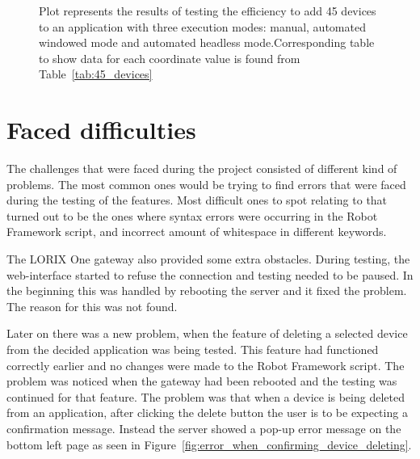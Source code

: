 \begin{figure}[H]
    \caption{Plot represents the results of testing the efficiency to add 45 devices to an application with three execution modes: manual, automated windowed mode and automated headless mode.Corresponding table to show data for each coordinate value is found from Table~\ref{tab:45_devices}}\label{fig:45_devices}
\end{figure}

\clearpage

\section{Faced difficulties}
The challenges that were faced during the project consisted of different kind of problems.
The most common ones would be trying to find errors that were faced during the testing of the features.
Most difficult ones to spot relating to that turned out to be the ones where syntax errors were occurring in the Robot Framework script, and incorrect amount of whitespace in different keywords.

The LORIX One gateway also provided some extra obstacles.
During testing, the web-interface started to refuse the connection and testing needed to be paused.
In the beginning this was handled by rebooting the server and it fixed the problem.
The reason for this was not found.

Later on there was a new problem, when the feature of deleting a selected device from the decided application was being tested.
This feature had functioned correctly earlier and no changes were made to the Robot Framework script. 
The problem was noticed when the gateway had been rebooted and the testing was continued for that feature.
The problem was that when a device is being deleted from an application, after clicking the delete button the user is to be expecting a confirmation message.
Instead the server showed a pop-up error message on the bottom left page as seen in Figure~\ref{fig:error_when_confirming_device_deleting}.

